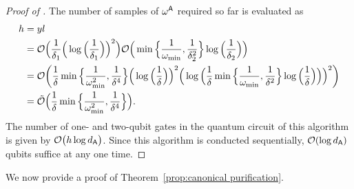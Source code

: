 \begin{proof}[Proof of ]
The number of samples of $\omega^{\mathsf{A}}$ required so far is evaluated as
\begin{align}
    h 
    &= yl \\ 
    &= {\mathcal{O}}\Big(\frac{1}{\delta_1}\Big(\log{\Big(\frac{1}{\delta_1}\Big)}\Big)^2\Big) {\mathcal{O}}\Big(\min\Big\{\frac{1}{\omega_{\rm min}}, \frac{1}{\delta_2^2}\Big\}\log{\Big(\frac{1}{\delta_2}\Big)}\Big) \\
    &={\mathcal{O}}\bigg(\frac{1}{\delta}\min\Big\{\frac{1}{\omega_{\rm min}^2}, \frac{1}{\delta^4}\Big\} \Big(\log{\Big(\frac{1}{\delta}\Big)}\Big)^2 \Big(\log{\Big(\frac{1}{\delta}\min\Big\{\frac{1}{\omega_{\rm min}}, \frac{1}{\delta^2}\Big\}\log\Big(\frac{1}{\delta}\Big)}\Big)\Big)^2\bigg) \\
    &=\tilde{{\mathcal{O}}}\Big(\frac{1}{\delta}\min\Big\{\frac{1}{\omega_{\rm min}^2}, \frac{1}{\delta^4}\Big\}\Big).
\end{align}
The number of one- and two-qubit gates in the quantum circuit of this algorithm is given by ${\mathcal{O}}\big(h\log{d_{\mathsf{A}}}\big)$.
Since this algorithm is conducted sequentially, ${\mathcal{O}}(\log{d_{\mathsf{A}}})$ qubits suffice at any one time.

\end{proof}



We now provide a proof of Theorem~\ref{prop:canonical purification}.


